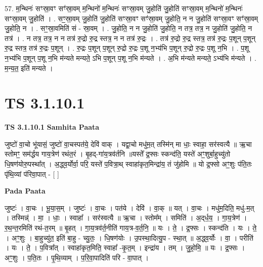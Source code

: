 \documentclass[17pt]{extarticle}
\begin{document}
57. म॒न्थिनः॑ सꣳस्रा॒वꣳ सꣳ॑स्रा॒वम् म॒न्थिनो॑ म॒न्थिनः॑ सꣳस्रा॒वम् जु॒होति॑ जु॒होति॑ सꣳस्रा॒वम् म॒न्थिनो॑ म॒न्थिनः॑ सꣳस्रा॒वम् जु॒होति॑ । . सꣳ॒॒स्रा॒वम् जु॒होति॑ जु॒होति॑ सꣳस्रा॒वꣳ सꣳ॑स्रा॒वम् जु॒होति॒ न न जु॒होति॑ सꣳस्रा॒वꣳ सꣳ॑स्रा॒वम् जु॒होति॒ न । . सꣳ॒॒स्रा॒वमिति॑ सं - स्रा॒वम् । . जु॒होति॒ न न जु॒होति॑ जु॒होति॒ न तत्र॒ तत्र॒ न जु॒होति॑ जु॒होति॒ न तत्र॑ । . न तत्र॒ तत्र॒ न न तत्र॑ रु॒द्रो रु॒द्र स्तत्र॒ न न तत्र॑ रु॒द्रः । . तत्र॑ रु॒द्रो रु॒द्र स्तत्र॒ तत्र॑ रु॒द्रः प॒शून् प॒शून् रु॒द्र स्तत्र॒ तत्र॑ रु॒द्रः प॒शून् । . रु॒द्रः प॒शून् प॒शून् रु॒द्रो रु॒द्रः प॒शू न॒भ्य॑भि प॒शून् रु॒द्रो रु॒द्रः प॒शू न॒भि । . प॒शू न॒भ्य॑भि प॒शून् प॒शू न॒भि म॑न्यते मन्यते॒ ऽभि प॒शून् प॒शू न॒भि म॑न्यते । . अ॒भि म॑न्यते मन्यते॒ ऽभ्य॑भि म॑न्यते । . म॒न्य॒त॒ इति॑ मन्यते । \newline
\pagebreak
{}

\section{ TS 3.1.10.1 }

\textbf{TS 3.1.10.1 } \newline
\textbf{Samhita Paata} \newline

जुष्टो॑ वा॒चो भू॑यासं॒ जुष्टो॑ वा॒चस्पत॑ये॒ देवि॑ वाक् । यद्वा॒चो मधु॑म॒त् तस्मि॑न् मा धाः॒ स्वाहा॒ सर॑स्वत्यै ॥ ऋ॒चा स्तोमꣳ॒॒ सम॑र्द्धय गाय॒त्रेण॑ रथंत॒रं । बृ॒हद्-गा॑य॒त्रव॑र्तनि ॥यस्ते᳚ द्र॒फ्सः स्कन्द॑ति॒ यस्ते॑ अꣳ॒॒शुर्बा॒हुच्यु॑तो धि॒षण॑योरु॒पस्था᳚त् । अ॒द्ध्व॒र्योर्वा॒ परि॒ यस्ते॑ प॒वित्रा॒थ् स्वाहा॑कृत॒मिन्द्रा॑य॒ तं जु॑होमि ॥ यो द्र॒फ्सो अꣳ॒॒शुः प॑ति॒तः पृ॑थि॒व्यां प॑रिवा॒पात् - [  ] \newline

\textbf{Pada Paata} \newline

जुष्टः॑ । वा॒चः । भू॒या॒स॒म् । जुष्टः॑ । वा॒चः । पत॑ये । देवि॑ । वा॒क् ॥ यत् । वा॒चः । मधु॑म॒दिति॒ मधु॑-म॒त् । तस्मिन्न्॑ । मा॒ । धाः॒ । स्वाहा᳚ । सर॑स्वत्यै ॥ ऋ॒चा । स्तोम᳚म् । समिति॑ । अ॒द्‌र्ध॒य॒ । गा॒य॒त्रेण॑ । र॒थ॒न्त॒रमिति॑ रथं-त॒रम् ॥ बृ॒हत् । गा॒य॒त्रव॑र्त॒नीति॑ गाय॒त्र-व॒र्त॒नि॒ ॥ यः । ते॒ । द्र॒फ्सः । स्कन्द॑ति । यः । ते॒ । अꣳ॒॒शुः । बा॒हुच्यु॑त॒ इति॑ बा॒हु - च्यु॒तः॒ । धि॒षण॑योः । उ॒पस्था॒दित्यु॒प - स्था॒त् ॥ अ॒द्ध्व॒र्योः । वा॒ । परीति॑ । यः । ते॒ । प॒वित्रा᳚त् । स्वाहा॑कृत॒मिति॒ स्वाहा᳚ -कृ॒त॒म् । इन्द्रा॑य । तम् । जु॒हो॒मि॒ ॥ यः । द्र॒फ्सः । अꣳ॒॒शुः । प॒ति॒तः । पृ॒थि॒व्याम् । प॒रि॒वा॒पादिति॑ परि - वा॒पात् ।  \newline
\end{document}
